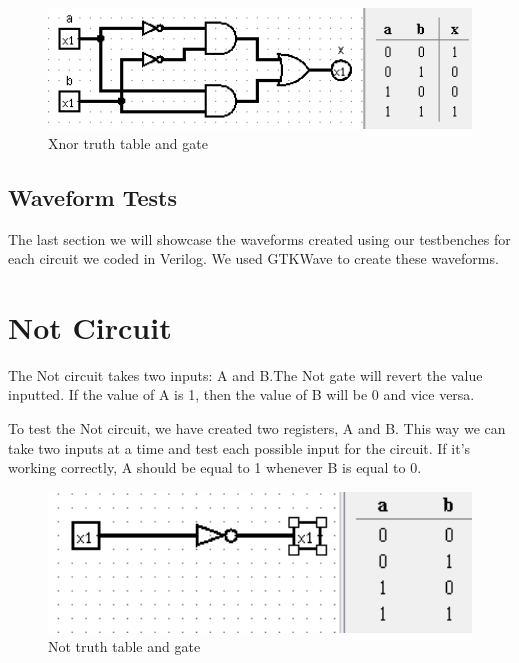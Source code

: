 \documentclass[12pt]{article}
\begin{document}
\begin{figure}[h]
    \centering
    \includegraphics[width = 1.0\textwidth]{figs/xnorgate.png}
    \caption{Xnor truth table and gate}
    \label{fig:enter-label}
\end{figure}

\newpage

\subsection{Waveform Tests}

The last section we will showcase the waveforms created using our testbenches for each circuit we coded in Verilog. We used GTKWave to create these waveforms.









\section{Not Circuit}
The Not circuit takes two inputs: A and B.The Not gate will revert the value inputted. If the value of A is 1, then the value of B will be 0 and vice versa.


To test the Not circuit, we have created two registers, A and B. This way we can take two inputs at a time and test each possible input for the circuit. If it's working correctly, A should be equal to 1 whenever B is equal to 0.


\begin{figure}[h]
    \centering
    \includegraphics[width = 1.0\textwidth]{figs/Not CircuitTruth.png}
    \caption{Not truth table and gate}
    \label{fig:enter-label}
\end{figure}
\end{document}
